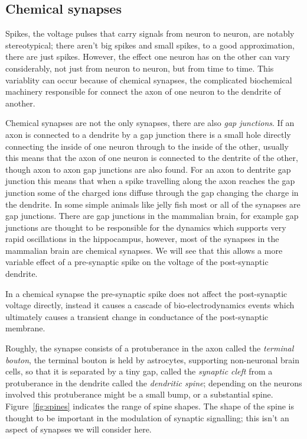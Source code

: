 \documentclass{article}
\begin{document}
\subsection*{Chemical synapses}

Spikes, the voltage pulses that carry signals from neuron to neuron,
are notably stereotypical; there aren't big spikes and small spikes,
to a good approximation, there are just spikes. However, the effect
one neuron has on the other can vary considerably, not just from
neuron to neuron, but from time to time. This variablity can occur
because of chemical synapses, the complicated biochemical machinery
responsible for connect the axon of one neuron to the dendrite of
another. 

Chemical synapses are not the only synapses, there are also
\textsl{gap junctions}. If an axon is connected to a dendrite by a gap
junction there is a small hole directly connecting the inside of one
neuron through to the inside of the other, usually this means that the
axon of one neuron is connected to the dentrite of the other, though
axon to axon gap junctions are also found. For an axon to dentrite gap
junction this means that when a spike travelling along the axon
reaches the gap junction some of the charged ions diffuse through the
gap changing the charge in the dendrite. In some simple animals like
jelly fish most or all of the synapses are gap junctions. There are
gap junctions in the mammalian brain, for example gap junctions are
thought to be responsible for the dynamics which supports very rapid
oscillations in the hippocampus, however, most of the synapses in the
mammalian brain are chemical synapses. We will see that this allows a
more variable effect of a pre-synaptic spike on the voltage of the
post-synaptic dendrite.

In a chemical synapse the pre-synaptic spike does not affect the
post-synaptic voltage directly, instead it causes a cascade of
bio-electrodynamics events which ultimately causes a transient change
in conductance of the post-synaptic membrane. 

Roughly, the synapse consists of a protuberance in the axon called the
\textsl{terminal bouton}, the terminal bouton is held by astrocytes,
supporting non-neuronal brain cells, so that it is separated by a tiny
gap, called the \textsl{synaptic cleft} from a protuberance in the
dendrite called the \textsl{dendritic spine}; depending on the neurons
involved this protuberance might be a small bump, or a substantial
spine. Figure~\ref{fig:spines} indicates the range of spine
shapes. The shape of the spine is thought to be important in the
modulation of synaptic signalling; this isn't an aspect of synapses we
will consider here.
\end{document}

